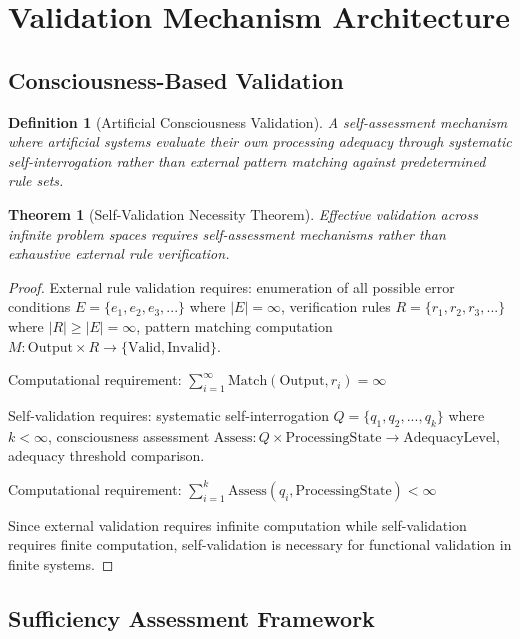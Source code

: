 \documentclass[12pt,a4paper]{article}
\newtheorem{theorem}{Theorem}
\newtheorem{definition}{Definition}
\begin{document}
\section{Validation Mechanism Architecture}

\subsection{Consciousness-Based Validation}

\begin{definition}[Artificial Consciousness Validation]
A self-assessment mechanism where artificial systems evaluate their own processing adequacy through systematic self-interrogation rather than external pattern matching against predetermined rule sets.
\end{definition}

\begin{theorem}[Self-Validation Necessity Theorem]
Effective validation across infinite problem spaces requires self-assessment mechanisms rather than exhaustive external rule verification.
\end{theorem}

\begin{proof}
External rule validation requires: enumeration of all possible error conditions $E = \{e_1, e_2, e_3, ...\}$ where $|E| = \infty$, verification rules $R = \{r_1, r_2, r_3, ...\}$ where $|R| \geq |E| = \infty$, pattern matching computation $M: \text{Output} \times R \to \{\text{Valid}, \text{Invalid}\}$.

Computational requirement: $\sum_{i=1}^{\infty} \text{Match}(\text{Output}, r_i) = \infty$

Self-validation requires: systematic self-interrogation $Q = \{q_1, q_2, ..., q_k\}$ where $k < \infty$, consciousness assessment $\text{Assess}: Q \times \text{ProcessingState} \to \text{AdequacyLevel}$, adequacy threshold comparison.

Computational requirement: $\sum_{i=1}^{k} \text{Assess}(q_i, \text{ProcessingState}) < \infty$

Since external validation requires infinite computation while self-validation requires finite computation, self-validation is necessary for functional validation in finite systems.
\end{proof}

\subsection{Sufficiency Assessment Framework}
\end{document}

